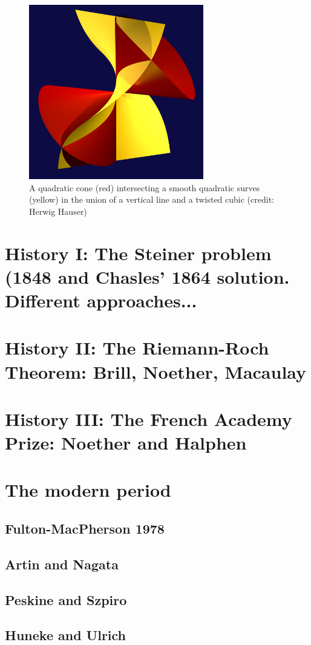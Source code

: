 \documentclass[11pt, oneside]{article}   	%
\begin{document}
\begin{figure}\label{cubicAndLine}
\centerline {\includegraphics[height=3in]{"main/Fig15-1-TwistAndShout"}}
 \caption{A quadratic cone (red) intersecting a smooth quadratic surves (yellow) in the union of a vertical line and a twisted cubic (credit: Herwig Hauser)}
\end{figure}





\section{History I: The Steiner problem (1848 and Chasles' 1864 solution. Different approaches...}
\section{History II: The Riemann-Roch Theorem: Brill, Noether, Macaulay}
\section{History III: The French Academy Prize: Noether and Halphen}
\section{The modern period}
\subsection{Fulton-MacPherson 1978}
\subsection{Artin and Nagata}
\subsection{Peskine and Szpiro}
\subsection{Huneke and Ulrich}
\end{document}
